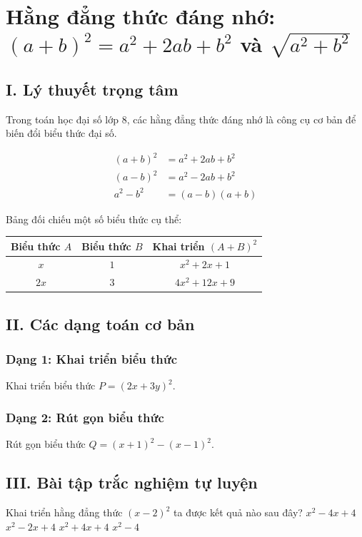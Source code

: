 \section{Hằng đẳng thức đáng nhớ: $(a+b)^2 = a^2 + 2ab + b^2$ và $\sqrt{a^2+b^2}$}

\subsection{I. Lý thuyết trọng tâm}
Trong toán học đại số lớp 8, các hằng đẳng thức đáng nhớ là công cụ cơ bản để biến đổi biểu thức đại số.

\begin{align*}
(a + b)^2 &= a^2 + 2ab + b^2 \\
(a - b)^2 &= a^2 - 2ab + b^2 \\
a^2 - b^2 &= (a - b)(a + b)
\end{align*}

Bảng đối chiếu một số biểu thức cụ thể:
\begin{center}
\begin{tabular}{|c|c|c|}
\hline
Biểu thức $A$ & Biểu thức $B$ & Khai triển $(A+B)^2$ \\
\hline
$x$ & $1$ & $x^2 + 2x + 1$ \\
$2x$ & $3$ & $4x^2 + 12x + 9$ \\
\hline
\end{tabular}
\end{center}

\subsection{II. Các dạng toán cơ bản}

\subsubsection{Dạng 1: Khai triển biểu thức}
\begin{vd}
Khai triển biểu thức $P = (2x + 3y)^2$.
\end{vd}

\subsubsection{Dạng 2: Rút gọn biểu thức}
\begin{bt}
Rút gọn biểu thức $Q = (x + 1)^2 - (x - 1)^2$.
\end{bt}

\subsection{III. Bài tập trắc nghiệm tự luyện}

\begin{ex}
Khai triển hằng đẳng thức $(x - 2)^2$ ta được kết quả nào sau đây?
\choice
{$x^2 - 4x + 4$}
{$x^2 - 2x + 4$}
{$x^2 + 4x + 4$}
{$x^2 - 4$}
\end{ex}
